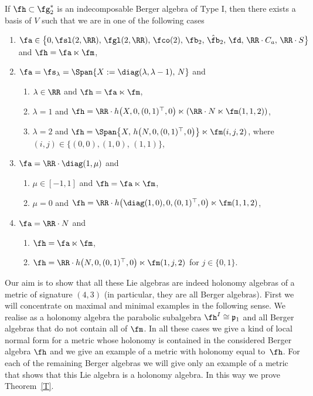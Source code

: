\begin{Theorem}[{{\cite{FK}}}]\label{T1}
If $\fh\subset \fg_2^*$ is an indecomposable Berger algebra of Type I, then there exists a basis of $V$ such that we are in one of the following cases
\begin{enumerate}\itemsep=0pt
\item[$1)$] $\fa\in \big\{0,\fsl(2,\RR),\, \fgl(2,\RR),\, \fco(2),\,\fb_2,\, \hat \fb_2,\, \fd,\,\RR\cdot C_a,\, \RR\cdot S\big\}$ and $\fh=\fa\ltimes \fm$,
\item[$2)$] $\fa=\fs_\lambda=\Span \{X:=\diag(\lambda,\lambda-1),\, N\}$ and
\begin{enumerate}\itemsep=0pt
\item[$a)$] $\lambda\in\RR$ and $\fh=\fa\ltimes \fm$,
\item[$b)$] $\lambda=1$ and $\fh=\RR\cdot h\big(X,0,(0,1)^\top,0\big)\ltimes (\RR\cdot N\ltimes \fm(1,1,2))$,
\item[$c)$] $\lambda=2$ and $\fh=\Span\big\{X,\, h\big(N,0,(0,1)^\top,0\big) \big\}\ltimes\fm(i,j,2)$, where $(i,j)\in\{(0,0),(1,0)$, $(1,1)\}$,
\end{enumerate}
\item[$3)$] $\fa=\RR\cdot\diag(1,\mu)$ and
\begin{enumerate}\itemsep=0pt
\item[$a)$] $\mu\in [-1,1]$ and $\fh=\fa\ltimes \fm$,
\item[$b)$] $\mu=0$ and $\fh=\RR\cdot h\big(\diag(1,0),0,(0,1)^\top,0\big)\ltimes \fm(1,1,2)$,
\end{enumerate}
\item[$4)$] $\fa=\RR\cdot N$ and
\begin{enumerate}\itemsep=0pt
\item[$a)$] $\fh=\fa\ltimes \fm$,
\item[$b)$] $\fh=\RR\cdot h\big(N,0,(0,1)^\top,0\big)\ltimes \fm(1,j,2)$ for $j\in\{0,1\}$.
\end{enumerate}
\end{enumerate}
\end{Theorem}

Our aim is to show that all these Lie algebras are indeed holonomy algebras of a metric of signature $(4,3)$ (in particular, they are all Berger algebras). First we will concentrate on maximal and minimal examples in the following sense. We realise as a holonomy algebra the parabolic subalgebra $\fh^I\cong\frak p_1$ and all Berger algebras that do not contain all of $\fm$. In all these cases we give a kind of local normal form for a metric whose holonomy is contained in the considered Berger algebra $\fh$ and we give an example of a metric with holonomy equal to~$\fh$. For each of the remaining Berger algebras we will give only an example of a metric that shows that this Lie algebra is a holonomy algebra. In this way we prove Theorem~\ref{T}.

